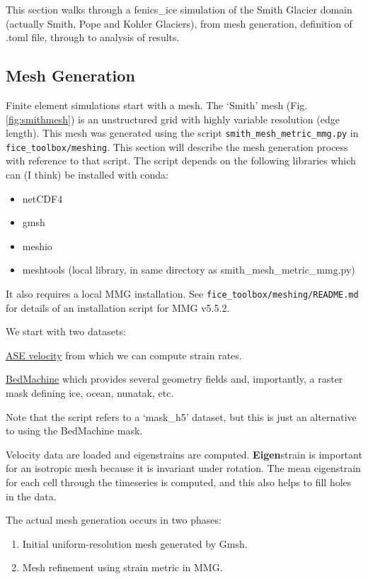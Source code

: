 \documentclass[11pt, reqno, nocenter]{article}
\begin{document}
This section walks through a fenics\_ice simulation of the Smith Glacier domain (actually Smith, Pope and Kohler Glaciers), from mesh generation, definition of .toml file, through to analysis of results.

\subsection{Mesh Generation}

Finite element simulations start with a mesh. The `Smith' mesh (Fig. \ref{fig:smithmesh}) is an unstructured grid with highly variable resolution (edge length). This mesh was generated using the script {\tt smith\_mesh\_metric\_mmg.py} in {\tt fice\_toolbox/meshing}. This section will describe the mesh generation process with reference to that script. The script depends on the following libraries which can (I think) be installed with conda:
\begin{itemize}
\item netCDF4
\item gmsh
\item meshio
\item meshtools (local library, in same directory as smith\_mesh\_metric\_mmg.py)
\end{itemize}

It also requires a local MMG installation. See {\tt fice\_toolbox/meshing/README.md} for details of an installation script for MMG v5.5.2.

We start with two datasets:

\href{https://nsidc.org/data/nsidc-0545}{ASE velocity} from which we can compute strain rates.

\href{https://nsidc.org/data/NSIDC-0756/versions/1}{BedMachine} which provides several geometry fields and, importantly, a raster mask defining ice, ocean, nunatak, etc.

Note that the script refers to a `mask\_h5' dataset, but this is just an alternative to using the BedMachine mask.

Velocity data are loaded and eigenstrains are computed. \textbf{Eigen}strain is important for an isotropic mesh because it is invariant under rotation. The mean eigenstrain for each cell through the timeseries is computed, and this also helps to fill holes in the data.

The actual mesh generation occurs in two phases:
\begin{enumerate}
\item Initial uniform-resolution mesh generated by Gmsh.
\item Mesh refinement using strain metric in MMG.
\end{enumerate}
\end{document}
